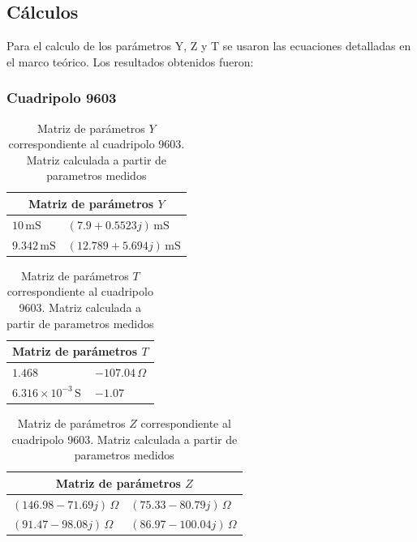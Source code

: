 \documentclass{article}
\begin{document}
     
    \subsection{Cálculos}

	Para el calculo de los parámetros Y, Z y T se usaron las ecuaciones detalladas en el marco teórico. Los resultados obtenidos fueron:
	
	\subsubsection*{Cuadripolo 9603}
	
	\begin{table}[H]
\centering
\begin{tabular}{|l|l|}
\hline
\multicolumn{2}{|c|}{\textbf{Matriz de parámetros $Y$}} \\ \hline
$10\,\mathrm{mS}$ & $(7.9 + 0.5523j)\,\mathrm{mS}$ \\ \hline
$9.342\,\mathrm{mS}$ & $(12.789 + 5.694j)\,\mathrm{mS}$ \\ \hline
\end{tabular}
\caption{Matriz de parámetros $Y$ correspondiente al cuadripolo 9603. Matriz calculada a partir de parametros medidos}
\label{tab:matriz_Y9603}
\end{table}

\begin{table}[H]
\centering
\begin{tabular}{|l|l|}
\hline
\multicolumn{2}{|c|}{\textbf{Matriz de parámetros $T$}} \\ \hline
$1.468$ & $-107.04\,\Omega$ \\ \hline
$6.316\times10^{-3}\,\mathrm{S}$ & $-1.07$ \\ \hline
\end{tabular}
\caption{Matriz de parámetros $T$ correspondiente al cuadripolo 9603. Matriz calculada a partir de parametros medidos}
\label{tab:matriz_T9603}
\end{table}

\begin{table}[H]
\centering
\begin{tabular}{|l|l|}
\hline
\multicolumn{2}{|c|}{\textbf{Matriz de parámetros $Z$}} \\ \hline
$(146.98 - 71.69j)\,\Omega$ & $(75.33 - 80.79j)\,\Omega$ \\ \hline
$(91.47 - 98.08j)\,\Omega$ & $(86.97 - 100.04j)\,\Omega$ \\ \hline
\end{tabular}
\caption{Matriz de parámetros $Z$ correspondiente al cuadripolo 9603. Matriz calculada a partir de parametros medidos}
\label{tab:matriz_Z9603}
\end{table}
\end{document}
